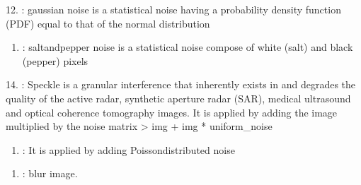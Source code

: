 \documentclass[letterpaper,10pt,english]{sphinxmanual}
\begin{document}

12. : gaussian noise is a statistical noise having a probability density function (PDF) equal
to that of the normal distribution

\begin{enumerate}
%
\setcounter{enumi}{12}
\item {} 
: salt\sphinxhyphen{}and\sphinxhyphen{}pepper noise is a statistical noise compose of white (salt) and black (pepper) pixels

\end{enumerate}


14. : Speckle is a granular interference that inherently exists in and degrades the quality of the active radar,
synthetic aperture radar (SAR), medical ultrasound and optical coherence tomography images.
It is applied by adding the image multiplied by the noise matrix \sphinxhyphen{}\textgreater{} img + img * uniform\_noise

\begin{enumerate}
%
\setcounter{enumi}{14}
\item {} 
: It is applied by adding Poisson\sphinxhyphen{}distributed noise

\end{enumerate}

\begin{enumerate}
%
\setcounter{enumi}{15}
\item {} 
: blur image.

\end{enumerate}
\end{document}
